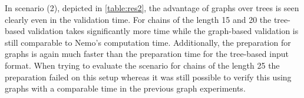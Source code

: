 \begin{table}
\centering
\caption{Results for scenario 2}
\label{table:res2}
\end{table}

In scenario (2), depicted in \cref{table:res2}, the advantage of graphs over trees is seen clearly even in the validation time. For chains of the length 15 and 20 the tree-based validation takes significantly more time while the graph-based validation is still comparable to Nemo's computation time. Additionally, the preparation for graphs is again much faster than the preparation time for the tree-based input format.  When trying to evaluate the scenario for chains of the length 25 the preparation failed on this setup whereas it was still possible to verify this using graphs with a comparable time in the previous graph experiments.

